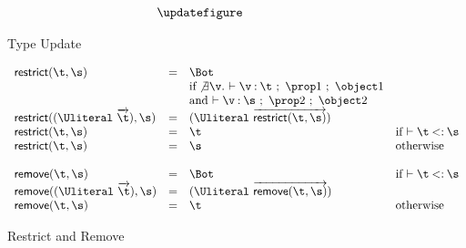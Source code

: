 \begin{figure*}
  $$
\begin{array}{lllll}
\updatefigure
\end{array}
$$
\caption{Type Update}
\label{main:figure:update}
\end{figure*}

\begin{figure}
  $$
\begin{array}{lllll}
  \restrictremovefigure{}
\end{array}
  $$
  \caption{Restrict and Remove}
  \label{main:figure:restrictremove}
\end{figure}
